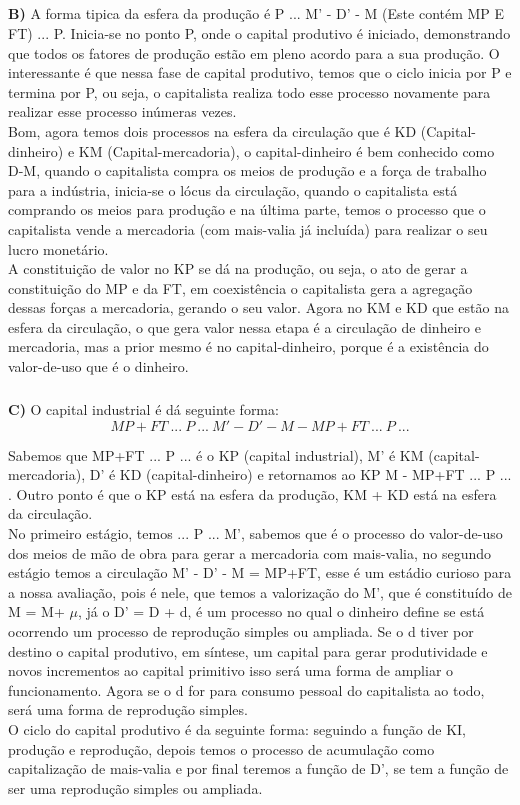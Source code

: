 \documentclass[a4paper, 12pt]{article} %
\begin{document}
\subparagraph{} \textbf{B)} A forma tipica da esfera da produção é P ... M' - D' - M (Este contém MP E FT) ... P. Inicia-se no ponto P, onde o capital produtivo é iniciado, demonstrando que todos os fatores de produção estão em pleno acordo para a sua produção. O interessante é que nessa fase de capital produtivo, temos que o ciclo inicia por P e termina por P, ou seja, o capitalista realiza todo esse processo novamente para realizar esse processo inúmeras vezes. 
\\
Bom, agora temos dois processos na esfera da circulação que é KD (Capital-dinheiro) e KM (Capital-mercadoria), o capital-dinheiro é bem conhecido como D-M, quando o capitalista compra os meios de produção e a força de trabalho para a indústria, inicia-se o lócus da circulação, quando o capitalista está comprando os meios para produção e na última parte, temos o processo que o capitalista vende a mercadoria (com mais-valia já incluída) para realizar o seu lucro monetário.
\\
A constituição de valor no KP se dá na produção, ou seja, o ato de gerar a constituição do MP e da FT, em coexistência o capitalista gera a agregação dessas forças a mercadoria, gerando o seu valor. Agora no KM e KD que estão na esfera da circulação, o que gera valor nessa etapa é a circulação de dinheiro e mercadoria, mas a prior mesmo é no capital-dinheiro, porque é a existência do valor-de-uso que é o dinheiro.

\subparagraph{} \textbf{C)} O capital industrial é dá seguinte forma:
\begin{equation}
 MP + FT \ ... \ P \ ... \ M' - D' - M - MP+FT \ ... \ P \ ... 
\end{equation}

Sabemos que MP+FT ... P ... é o KP (capital industrial), M' é KM (capital-mercadoria), D' é KD (capital-dinheiro) e retornamos ao KP M - MP+FT ... P ... . Outro ponto é que o KP está na esfera da produção, KM + KD está na esfera da circulação. \\
No primeiro estágio, temos ... P ... M', sabemos que é o processo do valor-de-uso dos meios de mão de obra para gerar a mercadoria com mais-valia, no segundo estágio temos a circulação M' - D' - M = MP+FT, esse é um estádio curioso para a nossa avaliação, pois é nele, que temos a valorização do M', que é constituído de M = M+ $\mu$, já o D' = D + d, é um processo no qual o dinheiro define se está ocorrendo um processo de reprodução simples ou ampliada. Se o d tiver por destino o capital produtivo, em síntese, um capital para gerar produtividade e novos incrementos ao capital primitivo isso será uma forma de ampliar o funcionamento. Agora se o d for para consumo pessoal do capitalista ao todo, será uma forma de reprodução simples.
\\
O ciclo do capital produtivo é da seguinte forma: seguindo a função de KI, produção e reprodução, depois temos o processo de acumulação como capitalização de mais-valia e por final teremos a função de D', se tem a função de ser uma reprodução simples ou ampliada.
\vspace{0.5cm}
\end{document}
